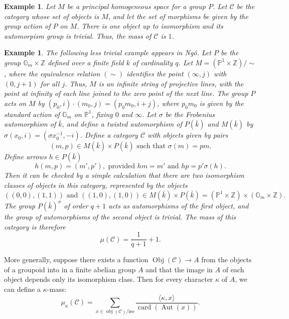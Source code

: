 \documentclass[brochure,english,12pt]{bourbaki}
\newtheorem{example}[equation]{Example}
\def\op#1{{\operatorname{#1}}}
\newcommand{\ring}[1]{\mathbb{#1}}
\def\C{{\mathcal C}}
\begin{document}
\begin{example}  Let $M$ be a principal homogeneous space for a group $P$.
Let ${\C}$ be the category whose set of objects is $M$, and let the set of morphisms
be given by the group action of $P$ on $M$.  There is one object up to isomorphism
and its automorpism group is trivial.  Thus, the mass of $\C$ is $1$.
\end{example}

\begin{example}\label{ex:groupoid}
  The following less trivial example appears in Ng\^o.  Let $P$ be the
  group $\ring{G}_m\times \ring{Z}$ defined over a finite field $k$ of
  cardinality $q$.  Let $M = (\ring{P}^1\times\ring{Z})/\sim$, where
  the equivalence relation $(\sim)$ identifies the point $(\infty,j)$ with
  $(0,j+1)$ for all $j$.  Thus, $M$ is an infinite string of
  projective lines, with the point at infinity of each line joined to
  the zero point of the next line.  The group $P$ acts on $M$ by
  $(p_0,i)\cdot (m_0,j) = (p_0 m_0,i+j)$, where $p_0m_0$ is given by
  the standard action of $\ring{G}_m$ on $\ring{P}^1$, fixing $0$ and
  $\infty$.  Let $\sigma$ be the Frobenius automorphism of $\bar k$,
  and define a twisted automorphism of $P(\bar k)$ and $M(\bar k)$ by
  $\sigma(x_0,i) = (\sigma x_0^{-1},-i)$.  Define a category $\mathcal
  C$ with objects given by pairs
\begin{equation}\label{eqn:objects}
(m,p)\in M(\bar k)\times P(\bar k) \text{ such that } \sigma(m) = p
m.
\end{equation}
Define  arrows $h\in P(\bar k)$ 
\begin{equation}\label{eqn:arrows}
h(m,p) = (m',p'),    \text{ provided } hm = m' \text{ and } h p = p'\sigma(h).
\end{equation}  
Then it can be checked by a simple
calculation that there are two isomorphism classes of objects in this
category, represented by the objects
\[
((0,0),(1,1))\text{ and }  ((1,0),(1,0))\in M(\bar k)\times P(\bar k) = 
(\ring{P}^1\times\ring{Z}) \times (\ring{G}_m\times\ring{Z}).
\]
The group $P(\bar k)^\sigma$ of order $q+1$ acts as automorphisms of the first object,
and the group of automorphisms of the second object is trivial.  The mass of this category
is therefore
\[
\mu(\C) = \frac{1}{q+1} + 1.
\]
\end{example}

More generally, suppose there exists a function $\op{Obj}(\C)\to  A$ from the objects
of a groupoid into in a finite abelian group $A$ and that the image in $A$ of each object
depends only its isomorphism class.  Then for every
character $\kappa$ of $A$, we can define a $\kappa$-mass:
\[
\mu_\kappa(\C)= \sum_{x\in \op{obj}(\C)/\text{iso}} \frac{\langle\kappa,x\rangle}{\op{card}(\op{Aut}(x))}.
\]
\end{document}
